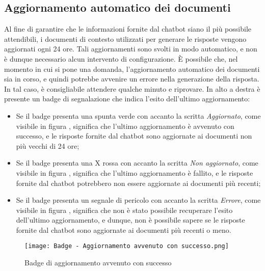 \subsection{Aggiornamento automatico dei documenti}
\label{subsec:aggiornamento_automatico_documenti}
Al fine di garantire che le informazioni fornite dal chatbot siano il più possibile attendibili, i documenti di contesto utilizzati per generare le risposte vengono aggiornati ogni 24 ore.
Tali aggiornamenti sono svolti in modo automatico, e non è dunque necessario alcun intervento di configurazione.
È possibile che, nel momento in cui si pone una domanda, l'aggiornamento automatico dei documenti sia in corso, e quindi potrebbe avvenire un errore nella generazione della risposta. In tal caso, è consigliabile attendere qualche minuto e riprovare.
In alto a destra è presente un badge di segnalazione che indica l'esito dell'ultimo aggiornamento:
\begin{itemize}
    \item Se il badge presenta una spunta verde con accanto la scritta \emph{Aggiornato}, come visibile in figura , significa che l'ultimo aggiornamento è avvenuto con successo, e le risposte fornite
    dal chatbot sono aggiornate ai documenti non più vecchi di 24 ore;
    \item Se il badge presenta una X rossa con accanto la scritta \emph{Non aggiornato}, come visibile in figura , significa che l'ultimo aggiornamento è fallito, e le risposte fornite dal chatbot potrebbero
    non essere aggiornate ai documenti più recenti;
    \item Se il badge presenta un segnale di pericolo con accanto la scritta \emph{Errore}, come visibile in figura , significa che non è stato possibile recuperare l'esito dell'ultimo aggiornamento, e
    dunque, non è possibile sapere se le risposte fornite dal chatbot sono aggiornate ai documenti più recenti o meno.
\end{itemize}

\begin{figure}[h]
    \centering
        \texttt{[image: Badge - Aggiornamento avvenuto con successo.png]}
        \caption{Badge di aggiornamento avvenuto con successo}
        \label{fig:Aggiornamento avvenuto con successo}        
\end{figure}

\newpage

